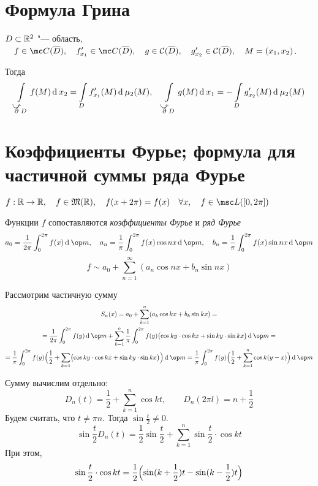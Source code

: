 \section{Формула Грина}

\begin{theorem}
	$ D \subset \mathbb{R}^2 $ "--- область, $ \quad f \in \mc C(\ol D), \quad f_{x_1}' \in \mc C(\ol D), \quad g \in \mathcal C(\ol D), \quad g_{x_2}' \in \mathcal C(\ol D), \quad M = (x_1, x_2) $.

	Тогда
	$$ \int\limits_{\curvedir \partial D} f(M) \di x_2 = \int\limits_D f_{x_1}'(M) \di \mu_2(M), \quad \int\limits_{\curvedir \partial D} g(M) \di x_1 = - \int\limits_D g_{x_2}'(M) \di \mu_2(M) $$
\end{theorem}

\section{Коэффициенты Фурье; формула для частичной суммы ряда Фурье}

\begin{definition}
	$ f : \R \to \R, \quad f \in \mathfrak M(\R), \quad f(x + 2\pi) = f(x) \quad \forall x, \quad f \in \msc L([0, 2\pi]) $

	Функции $ f $ сопоставляются \emph{коэффициенты Фурье} и \emph{ряд Фурье}
	$$ a_0 = \frac1{2\pi} \int_0^{2\pi} f(x) \di \op m, \quad a_n = \frac1\pi \int_0^{2\pi} f(x) \cos n x \di \op m, \quad b_n = \frac1\pi \int_0^{2\pi} f(x) \sin nx \di \op m $$
	$$ f \sim a_0 + \sum_{n = 1}^\infty (a_n \cos nx + b_n \sin nx) $$
\end{definition}

Рассмотрим частичную сумму
\begin{multline*}
	S_n(x) = a_0 + \sum_{k = 1}^n (a_k \cos kx + b_k \sin kx) = \\
	= \frac1{2\pi} \int_0^{2\pi} f(y) \di \op m + \sum_{k = 1}^n \frac1\pi \int_0^{2\pi} f(y) \bigl( \cos ky \cdot \cos kx + \sin ky \cdot \sin kx \bigr) \di \op m = \\
	= \frac1\pi \int_0^{2\pi} f(y) \Bigl( \frac12 + \sum_{k = 1} \bigl( \cos ky \cdot \cos kx + \sin ky \cdot \sin kx \bigr) \Bigr) \di \op m =
	\frac1\pi \int_0^{2\pi} f(y) \Bigl( \frac12 + \sum_{k = 1}^n \cos k(y - x) \Bigr) \di \op m
\end{multline*}

Сумму вычислим отдельно:
$$ D_n(t) = \frac12 + \sum_{k = 1}^n \cos kt, \qquad D_n(2\pi l) = n + \frac12 $$
Будем считать, что $ t \ne \pi n $. Тогда $ \sin \frac t2 \ne 0 $.
$$ \sin \frac t2 D_n(t) = \frac 12 \sin \frac t2 + \sum_{k = 1}^n \sin \frac t2 \cdot \cos kt $$
При этом,
$$ \sin \frac t2 \cdot \cos kt = \frac12 \Bigl( \sin (k + \frac12) t - \sin (k - \frac12) t \Bigr) $$

